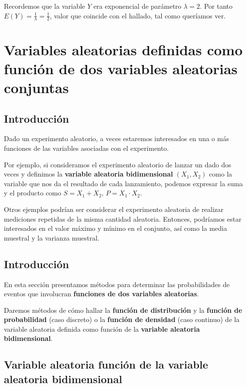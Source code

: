 \documentclass[]{book}
\begin{document}
Recordemos que la variable \(Y\) era exponencial de parámetro \(\lambda=2\). Por tanto \(E(Y)=\frac{1}{\lambda}=\frac{1}{2}\), valor que coincide con el hallado, tal como queríamos ver.

\hypertarget{variables-aleatorias-definidas-como-funciuxf3n-de-dos-variables-aleatorias-conjuntas}{%
\section{Variables aleatorias definidas como función de dos variables aleatorias conjuntas}\label{variables-aleatorias-definidas-como-funciuxf3n-de-dos-variables-aleatorias-conjuntas}}

\hypertarget{introducciuxf3n-9}{%
\subsection{Introducción}\label{introducciuxf3n-9}}

Dado un experimento aleatorio, a veces estaremos interesados en una o más funciones de las variables asociadas con el experimento.

Por ejemplo, si consideramos el experimento aleatorio de lanzar un dado dos veces y definimos la \textbf{variable aleatoria bidimensional} \((X_1,X_2)\) como la variable que nos da el resultado de cada lanzamiento, podemos expresar la suma y el producto como \(S=X_1+X_2\), \(P=X_1\cdot X_2\).

Otros ejemplos podrían ser considerar el experimento aleatoria de realizar mediciones repetidas de la misma cantidad aleatoria. Entonces, podríamos estar interesados en el valor máximo y mínimo en el conjunto, así como la media muestral y la varianza muestral.

\hypertarget{introducciuxf3n-10}{%
\subsection{Introducción}\label{introducciuxf3n-10}}

En esta sección presentamos métodos para determinar las probabilidades de eventos que involucran \textbf{funciones de dos variables aleatorias}.

Daremos métodos de cómo hallar la \textbf{función de distribución} y la \textbf{función de probabilidad} (caso discreto) o la \textbf{función de densidad} (caso continuo) de la variable aleatoria definida como función de la \textbf{variable aleatoria bidimensional}.

\hypertarget{variable-aleatoria-funciuxf3n-de-la-variable-aleatoria-bidimensional}{%
\subsection{Variable aleatoria función de la variable aleatoria bidimensional}\label{variable-aleatoria-funciuxf3n-de-la-variable-aleatoria-bidimensional}}
\end{document}
